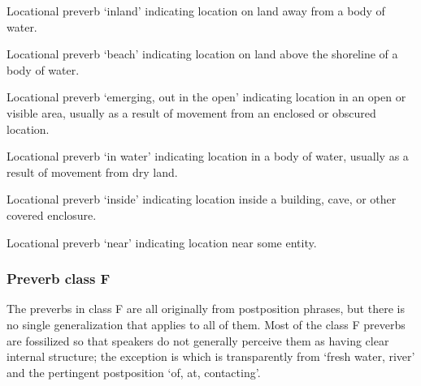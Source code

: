 \begin{morphdesc}
\item[\X{dáag̱i=}]
	Locational preverb ‘inland’ indicating location on land away from a body of water.
\item[\X{éeg̱i=}]
\item[\X{éig̱i=}]
	Locational preverb ‘beach’ indicating location on land above the shoreline of a body of water.
\item[\X{gági=}]
	Locational preverb ‘emerging, out in the open’ indicating location in an open or visible area,
		usually as a result of movement from an enclosed or obscured location.
\item[\X{héeni=}]
	Locational preverb ‘in water’ indicating location in a body of water,
		usually as a result of movement from dry land.
\item[\X{neilí=}]
	Locational preverb ‘inside’ indicating location inside a building, cave,
		or other covered enclosure.
\item[\X{x̱áni=}]
	Locational preverb ‘near’ indicating location near some entity.
\end{morphdesc}

\subsubsection{Preverb class F}\label{sec:inventory-preverb-F}

The preverbs in class F are all originally from postposition phrases, but there is no single
	generalization that applies to all of them.
Most of the class F preverbs are fossilized so that speakers do not generally perceive them as having
	clear internal structure; the exception is  which is transparently from
	 ‘fresh water, river’ and the pertingent postposition
	 ‘of, at, contacting’.

